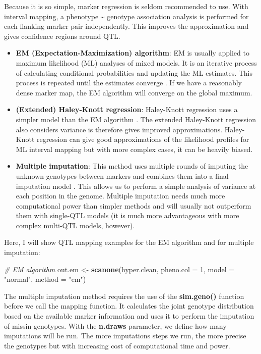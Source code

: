 \documentclass[12pt,]{book}
\newenvironment{Shaded}{\begin{snugshade}}{\end{snugshade}}
\newcommand{\KeywordTok}[1]{\textcolor[rgb]{0.27,0.27,0.27}{\textbf{{#1}}}}
\newcommand{\DataTypeTok}[1]{\textcolor[rgb]{0.27,0.27,0.27}{{#1}}}
\newcommand{\DecValTok}[1]{\textcolor[rgb]{0.06,0.06,0.06}{{#1}}}
\newcommand{\StringTok}[1]{\textcolor[rgb]{0.5,0.5,0.5}{{#1}}}
\newcommand{\CommentTok}[1]{\textcolor[rgb]{0.37,0.37,0.37}{\textit{{#1}}}}
\newcommand{\NormalTok}[1]{{#1}}
\providecommand{\tightlist}{%
  \setlength{\itemsep}{0pt}\setlength{\parskip}{0pt}}
\begin{document}
Because it is so simple, marker regression is seldom recommended to use.
With interval mapping, a phenotype \textasciitilde{} genotype
association analysis is performed for each flanking marker pair
independently. This improves the approximation and gives confidence
regions around QTL.

\begin{itemize}
\tightlist
\item
  \textbf{EM (Expectation-Maximization) algorithm}: EM is usually
  applied to maximum likelihood (ML) analyses of mixed models. It is an
  iterative process of calculating conditional probabilities and
  updating the ML estimates. This process is repeated until the
  estimates converge \citep{Lander185}. If we have a reasonably dense
  marker map, the EM algorithm will converge on the global maximum.
\item
  \textbf{(Extended) Haley-Knott regression}: Haley-Knott regression
  uses a simpler model than the EM algorithm \citep{Haley1992}. The
  extended Haley-Knott regression also considers variance is therefore
  gives improved approximations. Haley-Knott regression can give good
  approximations of the likelihood profiles for ML interval mapping but
  with more complex cases, it can be heavily biased.
\item
  \textbf{Multiple imputation}: This method uses multiple rounds of
  imputing the unknown genotypes between markers and combines them into
  a final imputation model \citep{Sen371}. This allows us to perform a
  simple analysis of variance at each position in the genome. Multiple
  imputation needs much more computational power than simpler methods
  and will usually not outperform them with single-QTL models (it is
  much more advantageous with more complex multi-QTL models, however).
\end{itemize}

Here, I will show QTL mapping examples for the EM algorithm and for
multiple imputation:

\begin{Shaded}
\begin{Highlighting}[]
\CommentTok{# EM algorithm}
\NormalTok{out.em <-}\StringTok{ }\KeywordTok{scanone}\NormalTok{(hyper.clean, }\DataTypeTok{pheno.col =} \DecValTok{1}\NormalTok{, }\DataTypeTok{model =} \StringTok{"normal"}\NormalTok{, }\DataTypeTok{method =} \StringTok{"em"}\NormalTok{)}
\end{Highlighting}
\end{Shaded}

The multiple imputation method requires the use of the
\textbf{sim.geno()} function before we call the mapping function. It
calculates the joint genotype distribution based on the available marker
information and uses it to perform the imputation of missin genotypes.
With the \textbf{n.draws} parameter, we define how many imputations will
be run. The more imputations steps we run, the more precise the
genotypes but with increasing cost of computational time and power.
\end{document}
